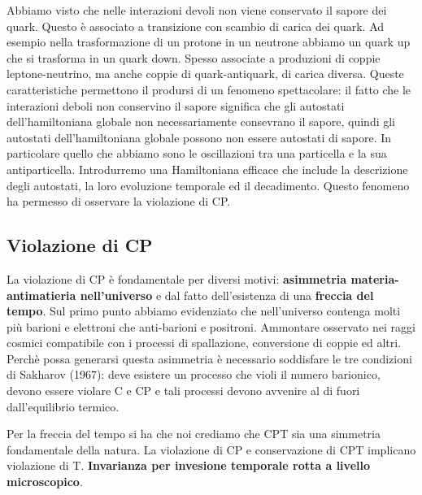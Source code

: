 Abbiamo visto che nelle interazioni devoli non viene conservato il sapore dei quark. Questo è associato a transizione con scambio di carica dei quark. Ad esempio nella trasformazione di un protone in un neutrone abbiamo un quark up che si trasforma in un quark down. Spesso associate a produzioni di coppie leptone-neutrino, ma anche coppie di quark-antiquark, di carica diversa. Queste caratteristiche permettono il prodursi di un fenomeno spettacolare: il fatto che le interazioni deboli non conservino il sapore significa che gli autostati dell'hamiltoniana globale non necessariamente consevrano il sapore, quindi gli autostati dell'hamiltoniana globale possono non essere autostati di sapore. In particolare quello che abbiamo sono le oscillazioni tra una particella e la sua antiparticella. Introdurremo una Hamiltoniana efficace che include la descrizione degli autostati, la loro evoluzione temporale ed il decadimento. Questo fenomeno ha permesso di osservare la violazione di CP.
\subsection{Violazione di CP}
La violazione di CP è fondamentale per diversi motivi: \textbf{asimmetria materia-antimatieria nell'universo} e dal fatto dell'esistenza di una \textbf{freccia del tempo}. Sul primo punto abbiamo evidenziato che nell'universo contenga molti più barioni e elettroni che anti-barioni e positroni. Ammontare osservato nei raggi cosmici compatibile con i processi di spallazione, conversione di coppie ed altri. Perchè possa generarsi questa asimmetria è necessario soddisfare le tre condizioni di Sakharov (1967): deve esistere un processo che violi il numero barionico, devono essere violare C e CP e tali processi devono avvenire al di fuori dall'equilibrio termico.

Per la freccia del tempo si ha che noi crediamo che CPT sia una simmetria fondamentale della natura. La violazione di CP e conservazione di CPT implicano violazione di T. \textbf{Invarianza per invesione temporale rotta a livello microscopico}.
